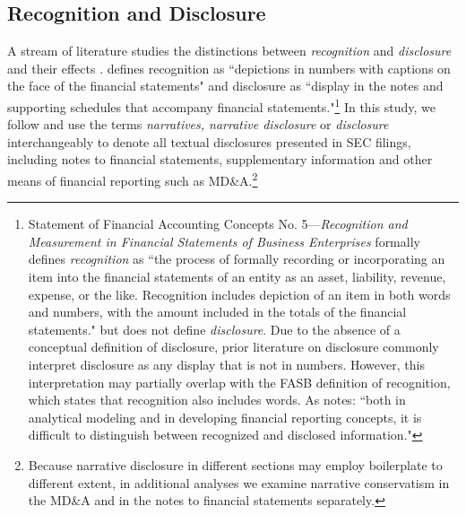 \documentclass[letterpaper,12pt]{article}
\begin{document}
\begin{spacing}{1.5}
\subsection{Recognition and Disclosure}\label{sec2.1}
\noindent A stream of literature studies the distinctions between \textit{recognition} and \textit{disclosure} and their effects \cite{aboodyRecognitionDisclosureOil1996, barthMarketEffectsRecognition2003, schipperRequiredDisclosuresFinancial2007}.  defines recognition as ``depictions in numbers with captions on the face of the financial statements" and disclosure as ``display in the notes and supporting schedules that accompany financial statements."\footnote{Statement of Financial Accounting Concepts No. 5---\textit{Recognition and Measurement in Financial Statements of Business Enterprises} formally defines \textit{recognition} as ``the process of formally recording or incorporating an item into the financial statements of an entity as an asset, liability, revenue, expense, or the like. Recognition includes depiction of an item in both words and numbers, with the amount included in the totals of the financial statements." \cite[par. 6]{fasbStatementFinancialAccounting1984} but does not define \textit{disclosure}. Due to the absence of a conceptual definition of disclosure, prior literature on disclosure commonly interpret disclosure as any display that is not in numbers. However, this interpretation may partially overlap with the FASB definition of recognition, which states that recognition also includes words. As  notes: ``both in analytical modeling and in developing financial reporting concepts, it is difficult to distinguish between recognized and disclosed information."} In this study, we follow  and use the terms \textit{narratives, narrative disclosure} or \textit{disclosure} interchangeably to denote all textual disclosures presented in SEC filings, including notes to financial statements, supplementary information and other means of financial reporting such as MD\&A.\footnote{Because narrative disclosure in different sections may employ boilerplate to different extent, in additional analyses we examine narrative conservatism in the MD\&A and in the notes to financial statements separately.}


\end{spacing}
\end{document}
